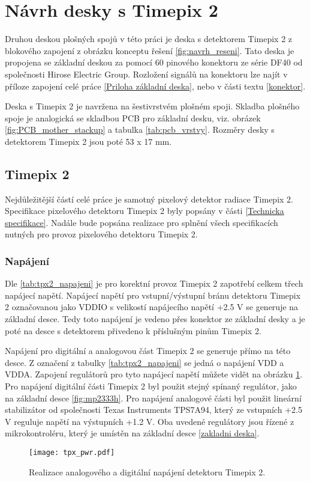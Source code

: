 \section{Návrh desky s Timepix 2}
	\label{Deska s Timepix2}
	Druhou deskou plošných spojů v této práci je deska s detektorem Timepix 2 z blokového zapojení z obrázku konceptu řešení \ref{fig:navrh_reseni}. Tato deska je propojena se základní deskou za pomocí 60 pinového konektoru ze série DF40 od společnosti Hirose Electric Group. Rozložení signálů na konektoru lze najít v příloze zapojení celé práce \ref{Priloha základní deska}, nebo v části textu \ref{konektor}.
	
	\par Deska s Timepix 2 je navržena na šestivrstvém plošném spoji. Skladba plošného spoje je analogická se skladbou PCB pro základní desku, viz. obrázek \ref{fig:PCB_mother_stackup} a tabulka \ref{tab:pcb_vrstvy}. Rozměry desky s detektorem Timepix 2 jsou poté 53 x 17 mm. 
\subsection{Timepix 2}	%
	Nejdůležitější částí celé práce je samotný pixelový detektor radiace Timepix 2. Specifikace pixelového detektoru Timepix 2 byly popsány v části \ref{Technicka specifikace}. Nadále bude popsána realizace pro splnění všech specifikacích nutných pro provoz pixelového detektoru Timepix 2.
	\subsubsection{Napájení}	%
	Dle \ref{tab:tpx2_napajeni} je pro korektní provoz Timepix 2 zapotřebí celkem třech napájecí napětí. Napájecí napětí pro vstupní/výstupní bránu detektoru Timepix 2 označovanou jako VDDIO s velikostí napájecího napětí +2.5 V se generuje na základní desce. Tedy toto napájení je vedeno přes konektor ze základní desky a je poté na desce s detektorem přivedeno k příslušným pinům Timepix 2.
	\par Napájení pro digitální a analogovou část Timepix 2 se generuje přímo na této desce. Z označení z tabulky \ref{tab:tpx2_napajeni} se jedná o napájení VDD a VDDA. Zapojení regulátorů pro tyto napájecí napětí můžete vidět na obrázku \ref{fig:tpx_pwr}. Pro napájení digitální části Timepix 2 byl použit stejný spínaný regulátor, jako na základní desce \ref{fig:mp2333h}. Pro napájení analogové části byl použit lineární stabilizátor od společnosti Texas Instruments TPS7A94, který ze vstupních +2.5 V reguluje napětí na výstupních +1.2 V. Oba uvedené regulátory jsou řízené z mikrokontroléru, který je umístěn na základní desce \ref{zakladni deska}.
	\begin{figure}[h!]
		\centering
		\captionsetup{justification=centering}
		\texttt{[image: tpx\_pwr.pdf]}
		\caption{Realizace analogového a digitální napájení detektoru Timepix 2.} 
		\label{fig:tpx_pwr}
	\end{figure} 
